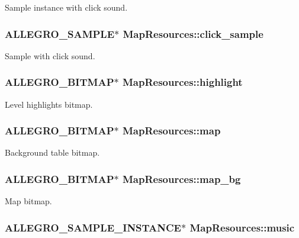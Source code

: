 Sample instance with click sound. \hypertarget{structMapResources_a67961c30f705207e424e592cf2c62232}{
\subsubsection[{click\+\_\+sample}]{\setlength{\rightskip}{0pt plus 5cm}A\+L\+L\+E\+G\+R\+O\+\_\+\+S\+A\+M\+P\+L\+E$\ast$ Map\+Resources\+::click\+\_\+sample}}\label{structMapResources_a67961c30f705207e424e592cf2c62232}
Sample with click sound. \hypertarget{structMapResources_ad37b071d815d22a476d2f1d1b4ad2e56}{
\subsubsection[{highlight}]{\setlength{\rightskip}{0pt plus 5cm}A\+L\+L\+E\+G\+R\+O\+\_\+\+B\+I\+T\+M\+A\+P$\ast$ Map\+Resources\+::highlight}}\label{structMapResources_ad37b071d815d22a476d2f1d1b4ad2e56}
Level highlights bitmap. \hypertarget{structMapResources_a3ff4f6cd4a1ba2c757bff8d3073df3bc}{
\subsubsection[{map}]{\setlength{\rightskip}{0pt plus 5cm}A\+L\+L\+E\+G\+R\+O\+\_\+\+B\+I\+T\+M\+A\+P$\ast$ Map\+Resources\+::map}}\label{structMapResources_a3ff4f6cd4a1ba2c757bff8d3073df3bc}
Background table bitmap. \hypertarget{structMapResources_afc6674a59c750770cc515f10e4b4d656}{
\subsubsection[{map\+\_\+bg}]{\setlength{\rightskip}{0pt plus 5cm}A\+L\+L\+E\+G\+R\+O\+\_\+\+B\+I\+T\+M\+A\+P$\ast$ Map\+Resources\+::map\+\_\+bg}}\label{structMapResources_afc6674a59c750770cc515f10e4b4d656}
Map bitmap. \hypertarget{structMapResources_aad2fee17c3652e5b87ec439c64bd1052}{
\subsubsection[{music}]{\setlength{\rightskip}{0pt plus 5cm}A\+L\+L\+E\+G\+R\+O\+\_\+\+S\+A\+M\+P\+L\+E\+\_\+\+I\+N\+S\+T\+A\+N\+C\+E$\ast$ Map\+Resources\+::music}}\label{structMapResources_aad2fee17c3652e5b87ec439c64bd1052}
